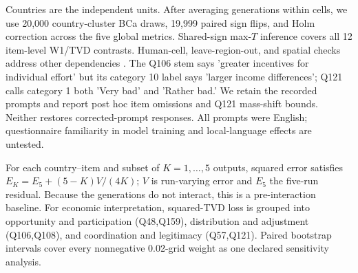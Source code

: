Countries are the independent units. After averaging generations within cells,
we use 20,000 country-cluster BCa draws, 19,999 paired sign flips, and Holm
correction across the five global metrics. Shared-sign max-$T$ inference covers
all 12 item-level W1/TVD contrasts. Human-cell, leave-region-out, and spatial
checks address other dependencies
\citep{moran1950notes,geary1954contiguity,anselin1988spatial,conley1999gmm}.
The Q106 stem says 'greater incentives for individual effort' but its category
10 label says 'larger income differences'; Q121 calls category 1 both 'Very
bad' and 'Rather bad.' We retain the recorded prompts and report post hoc
item omissions and Q121 mass-shift bounds. Neither restores corrected-prompt
responses. All prompts were English; questionnaire familiarity in model training
and local-language effects are untested.

For each country--item and subset of $K=1,\ldots,5$ outputs, squared error satisfies
$E_K=E_5+(5-K)V/(4K)$; $V$ is run-varying error and $E_5$ the five-run residual. Because
the generations do not interact, this is a pre-interaction baseline. For economic
interpretation, squared-TVD loss is grouped into opportunity and participation (Q48,Q159),
distribution and adjustment (Q106,Q108), and coordination and legitimacy (Q57,Q121).
Paired bootstrap intervals cover every nonnegative 0.02-grid weight as one declared
sensitivity analysis.
